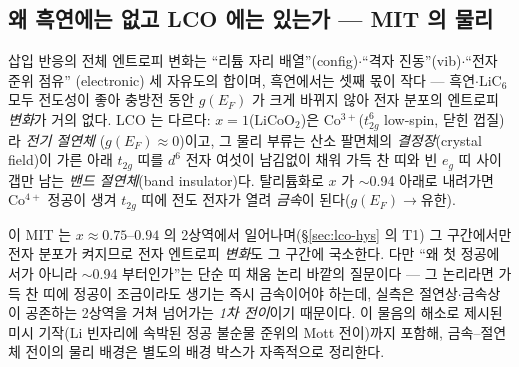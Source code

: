 \subsection{왜 흑연에는 없고 LCO 에는 있는가 --- MIT 의 물리}\label{sec:lco-why}
삽입 반응의 전체 엔트로피 변화는 ``리튬 자리 배열''(config)$\cdot$``격자 진동''(vib)$\cdot$``전자 준위 점유''
(electronic) 세 자유도의 합이며, 흑연에서는 셋째 몫이 작다 --- 흑연$\cdot$$\mathrm{LiC_6}$ 모두 전도성이 좋아
충방전 동안 $g(E_F)$ 가 크게 바뀌지 않아 전자 분포의 엔트로피 \emph{변화}가 거의 없다. LCO 는 다르다:
$x{=}1$($\mathrm{LiCoO_2}$)은 Co$^{3+}$($t_{2g}^6$ low-spin, 닫힌 껍질)라 \emph{전기 절연체}
($g(E_F)\!\approx\!0$)이고, 그 물리 부류는 산소 팔면체의 \emph{결정장}(crystal field)이 가른 아래 $t_{2g}$
띠를 $d^6$ 전자 여섯이 남김없이 채워 가득 찬 띠와 빈 $e_g$ 띠 사이 갭만 남는 \emph{밴드 절연체}(band
insulator)다. 탈리튬화로 $x$ 가 $\sim$0.94 아래로 내려가면 Co$^{4+}$ 정공이 생겨 $t_{2g}$ 띠에 전도 전자가
열려 \emph{금속}이 된다($g(E_F)\!\to\!$유한)\cite{menetrier1999,motohashi2009}.

이 MIT 는 $x\approx0.75$--$0.94$ 의 2상역에서 일어나며(\S\ref{sec:lco-hys} 의 T1) 그 구간에서만 전자 분포가
켜지므로 전자 엔트로피 \emph{변화}도 그 구간에 국소한다. 다만 ``왜 첫 정공에서가 아니라 $\sim$0.94
부터인가''는 단순 띠 채움 논리 바깥의 질문이다 --- 그 논리라면 가득 찬 띠에 정공이 조금이라도 생기는 즉시
금속이어야 하는데, 실측은 절연상$\cdot$금속상이 공존하는 2상역을 거쳐 넘어가는 \emph{1차 전이}이기
때문이다\cite{menetrier1999,reimers1992}. 이 물음의 해소로 제시된 미시 기작(Li 빈자리에 속박된 정공 불순물
준위의 Mott 전이\cite{marianetti2004})까지 포함해, 금속--절연체 전이의 물리 배경은 별도의 배경 박스가
자족적으로 정리한다.

